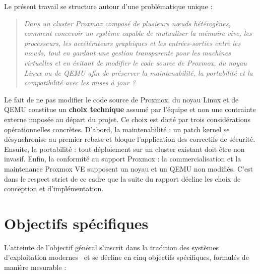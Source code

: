 Le présent travail se structure autour d'une problématique unique :

\begin{quote}
\itshape
Dans un cluster Proxmox composé de plusieurs nœuds hétérogènes, comment concevoir un système capable de mutualiser la mémoire vive, les processeurs, les accélérateurs graphiques et les entrées-sorties entre les nœuds, tout en gardant une gestion transparente pour les machines virtuelles et en évitant de modifier le code source de Proxmox, du noyau Linux ou de QEMU afin de préserver la maintenabilité, la portabilité et la compatibilité avec les mises à jour ?
\end{quote}

Le fait de ne pas modifier le code source de Proxmox, du noyau Linux et de QEMU constitue un \textbf{choix technique} assumé par l'équipe et non une contrainte externe imposée au départ du projet. Ce choix est dicté par trois considérations opérationnelles concrètes. D'abord, la maintenabilité : un patch kernel se désynchronise au premier rebase et bloque l'application des correctifs de sécurité. Ensuite, la portabilité : tout déploiement sur un cluster existant doit être non invasif. Enfin, la conformité au support Proxmox : la commercialisation et la maintenance Proxmox VE supposent un noyau et un QEMU non modifiés. C'est dans le respect strict de ce cadre que la suite du rapport décline les choix de conception et d'implémentation.

\section*{Objectifs spécifiques}

L'atteinte de l'objectif général s'inscrit dans la tradition des systèmes d'exploitation modernes~\cite{tanenbaum_os} et se décline en cinq objectifs spécifiques, formulés de manière mesurable :

